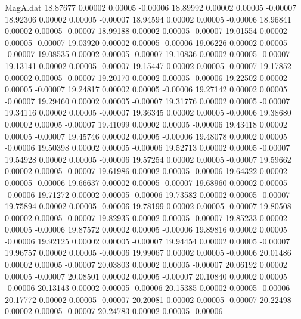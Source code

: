 \begin{filecontents}{MagA.dat}
  18.87677    0.00002    0.00005   -0.00006
  18.89992    0.00002    0.00005   -0.00007
  18.92306    0.00002    0.00005   -0.00007
  18.94594    0.00002    0.00005   -0.00006
  18.96841    0.00002    0.00005   -0.00007
  18.99188    0.00002    0.00005   -0.00007
  19.01554    0.00002    0.00005   -0.00007
  19.03920    0.00002    0.00005   -0.00006
  19.06226    0.00002    0.00005   -0.00007
  19.08535    0.00002    0.00005   -0.00007
  19.10836    0.00002    0.00005   -0.00007
  19.13141    0.00002    0.00005   -0.00007
  19.15447    0.00002    0.00005   -0.00007
  19.17852    0.00002    0.00005   -0.00007
  19.20170    0.00002    0.00005   -0.00006
  19.22502    0.00002    0.00005   -0.00007
  19.24817    0.00002    0.00005   -0.00006
  19.27142    0.00002    0.00005   -0.00007
  19.29460    0.00002    0.00005   -0.00007
  19.31776    0.00002    0.00005   -0.00007
  19.34116    0.00002    0.00005   -0.00007
  19.36345    0.00002    0.00005   -0.00006
  19.38680    0.00002    0.00005   -0.00007
  19.41099    0.00002    0.00005   -0.00006
  19.43418    0.00002    0.00005   -0.00007
  19.45746    0.00002    0.00005   -0.00006
  19.48078    0.00002    0.00005   -0.00006
  19.50398    0.00002    0.00005   -0.00006
  19.52713    0.00002    0.00005   -0.00007
  19.54928    0.00002    0.00005   -0.00006
  19.57254    0.00002    0.00005   -0.00007
  19.59662    0.00002    0.00005   -0.00007
  19.61986    0.00002    0.00005   -0.00006
  19.64322    0.00002    0.00005   -0.00006
  19.66637    0.00002    0.00005   -0.00007
  19.68960    0.00002    0.00005   -0.00006
  19.71272    0.00002    0.00005   -0.00006
  19.73582    0.00002    0.00005   -0.00007
  19.75894    0.00002    0.00005   -0.00006
  19.78199    0.00002    0.00005   -0.00007
  19.80508    0.00002    0.00005   -0.00007
  19.82935    0.00002    0.00005   -0.00007
  19.85233    0.00002    0.00005   -0.00006
  19.87572    0.00002    0.00005   -0.00006
  19.89816    0.00002    0.00005   -0.00006
  19.92125    0.00002    0.00005   -0.00007
  19.94454    0.00002    0.00005   -0.00007
  19.96757    0.00002    0.00005   -0.00006
  19.99067    0.00002    0.00005   -0.00006
  20.01486    0.00002    0.00005   -0.00007
  20.03803    0.00002    0.00005   -0.00007
  20.06192    0.00002    0.00005   -0.00007
  20.08501    0.00002    0.00005   -0.00007
  20.10840    0.00002    0.00005   -0.00006
  20.13143    0.00002    0.00005   -0.00006
  20.15385    0.00002    0.00005   -0.00006
  20.17772    0.00002    0.00005   -0.00007
  20.20081    0.00002    0.00005   -0.00007
  20.22498    0.00002    0.00005   -0.00007
  20.24783    0.00002    0.00005   -0.00006

\end{filecontents}
